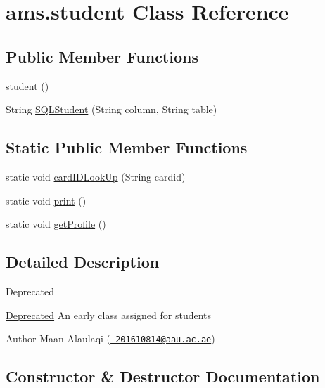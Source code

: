 \hypertarget{classams_1_1student}{}\section{ams.\+student Class Reference}
\label{classams_1_1student}
\subsection*{Public Member Functions}
\begin{DoxyCompactItemize}
\item 
\mbox{\hyperlink{classams_1_1student_ad03bb53d0a1de89f9e960925e3f226ef}{student}} ()
\item 
String \mbox{\hyperlink{classams_1_1student_aaf15213b221829a2c44c15a859af9da2}{S\+Q\+L\+Student}} (String column, String table)
\end{DoxyCompactItemize}
\subsection*{Static Public Member Functions}
\begin{DoxyCompactItemize}
\item 
static void \mbox{\hyperlink{classams_1_1student_a8395e89b09114ce0b7d2c343b11c6d41}{card\+I\+D\+Look\+Up}} (String cardid)
\item 
static void \mbox{\hyperlink{classams_1_1student_a7a8c1d0c0952dfd7e9e71f90bd70d09e}{print}} ()
\item 
static void \mbox{\hyperlink{classams_1_1student_a42b04eee66eade655dc460f622ebd7cd}{get\+Profile}} ()
\end{DoxyCompactItemize}


\subsection{Detailed Description}
\begin{DoxyRefDesc}{Deprecated}
\item[\mbox{\hyperlink{deprecated__deprecated000001}{Deprecated}}]An early class assigned for students\end{DoxyRefDesc}


\begin{DoxyAuthor}{Author}
Maan Alaulaqi (\href{mailto:201610814@aau.ac.ae}{\texttt{ 201610814@aau.\+ac.\+ae}}) 
\end{DoxyAuthor}


\subsection{Constructor \& Destructor Documentation}
\mbox{\label{classams_1_1student_ad03bb53d0a1de89f9e960925e3f226ef}} 

